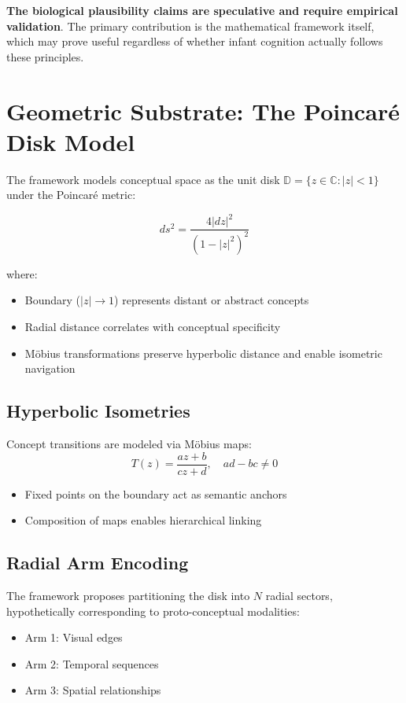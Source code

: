 \documentclass[10pt]{article}
\begin{document}
\textbf{The biological plausibility claims are speculative and require empirical validation}. The primary contribution is the mathematical framework itself, which may prove useful regardless of whether infant cognition actually follows these principles.

\section{Geometric Substrate: The Poincaré Disk Model}

The framework models conceptual space as the unit disk $\mathbb{D} = \{z \in \mathbb{C} : |z| < 1\}$ under the Poincaré metric:

$$ds^2 = \frac{4|dz|^2}{(1-|z|^2)^2}$$

where:
\begin{itemize}
    \item Boundary ($|z| \to 1$) represents distant or abstract concepts
    \item Radial distance correlates with conceptual specificity
    \item Möbius transformations preserve hyperbolic distance and enable isometric navigation
\end{itemize}

\subsection{Hyperbolic Isometries}

Concept transitions are modeled via Möbius maps:
$$T(z) = \frac{az + b}{cz + d}, \quad ad - bc \neq 0$$

\begin{itemize}
    \item Fixed points on the boundary act as semantic anchors
    \item Composition of maps enables hierarchical linking
\end{itemize}

\subsection{Radial Arm Encoding}

The framework proposes partitioning the disk into $N$ radial sectors, hypothetically corresponding to proto-conceptual modalities:
\begin{itemize}
    \item Arm 1: Visual edges
    \item Arm 2: Temporal sequences  
    \item Arm 3: Spatial relationships
\end{itemize}
\end{document}
